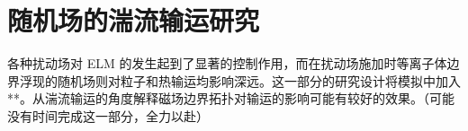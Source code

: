 \chapter{随机场的湍流输运研究}

各种扰动场对 ELM 的发生起到了显著的控制作用，而在扰动场施加时等离子体边界浮现的随机场则对粒子和热输运均影响深远。这一部分的研究设计将模拟中加入**。从湍流输运的角度解释磁场边界拓扑对输运的影响可能有较好的效果。（可能没有时间完成这一部分，全力以赴）
